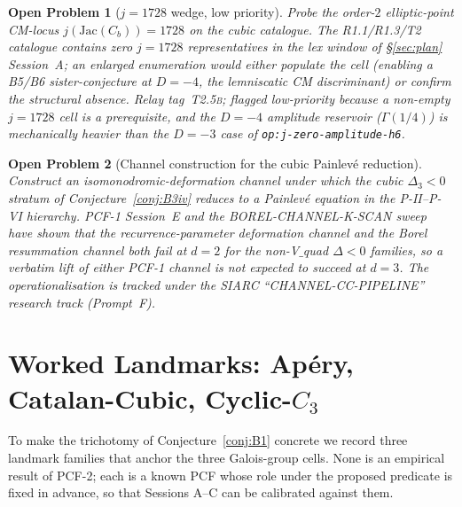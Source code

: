 \documentclass[11pt,a4paper]{article}
\newtheorem{problem}{Open Problem}
\theoremstyle{definition}
\theoremstyle{remark}
\begin{document}
\begin{problem}[$j=1728$ wedge, low priority]\label{op:j-1728-wedge}
Probe the order-$2$ elliptic-point CM-locus
$j(\mathrm{Jac}(C_b))=1728$ on the cubic catalogue. The R1.1/R1.3/T2
catalogue contains zero $j=1728$ representatives in the lex window
of \S\ref{sec:plan} Session~A; an enlarged enumeration would either
populate the cell (enabling a B5/B6 sister-conjecture at $D=-4$, the
lemniscatic CM discriminant) or confirm the structural absence.
Relay tag~\textsc{T2.5b}; flagged low-priority because a non-empty
$j=1728$ cell is a prerequisite, and the $D=-4$ amplitude reservoir
($\Gamma(1/4)$) is mechanically heavier than the $D=-3$ case of
\texttt{op:j-zero-amplitude-h6}.
\end{problem}

\begin{problem}[Channel construction for the cubic Painlev\'e
reduction]\label{op:cc-pipeline}
Construct an isomonodromic-deformation channel under which the cubic
$\Delta_{3}<0$ stratum of Conjecture~\ref{conj:B3iv} reduces to a
Painlev\'e equation in the P-II--P-VI hierarchy. PCF-1 Session~E and
the BOREL-CHANNEL-K-SCAN sweep~\cite{Papanokechi2026PCF1} have shown
that the recurrence-parameter deformation channel and the Borel
resummation channel both fail at $d=2$ for the
non-V$\_$quad $\Delta<0$ families, so a verbatim lift of either
PCF-1 channel is not expected to succeed at $d=3$. The
operationalisation is tracked under the SIARC ``CHANNEL-CC-PIPELINE''
research track (Prompt~F).
\end{problem}

\section{Worked Landmarks: Ap\'ery, Catalan-Cubic, Cyclic-$C_{3}$}\label{sec:landmarks}

To make the trichotomy of Conjecture~\ref{conj:B1} concrete we record
three landmark families that anchor the three Galois-group cells. None
is an empirical result of PCF-2; each is a known PCF whose role under
the proposed predicate is fixed in advance, so that Sessions A--C can be
calibrated against them.
\end{document}
